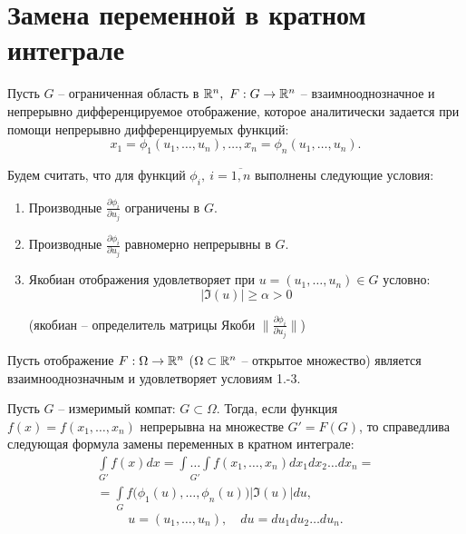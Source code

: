 

\section{Замена переменной в кратном интеграле}

\begin{note}
    Пусть $ G $ -- ограниченная область в $ \mathbb{R}^n, \ F: G \rightarrow \mathbb{R}^n $ -- взаимнооднозначное и непрерывно дифференцируемое отображение, которое аналитически задается при помощи непрерывно дифференцируемых функций:
    \[
        x_1 = \phi_1(u_1,\ldots,u_n),\ldots,x_n = \phi_n(u_1,\ldots,u_n).
    \]

    Будем считать, что для функций $ \phi_i, \ i = \overline{1,n} $ выполнены следующие условия:
    \begin{enumerate}
        \item Производные $ \frac{\partial \phi_i}{\partial u_j} $ ограничены в $ G $.
        \item Производные $ \frac{\partial \phi_i}{\partial u_j} $ равномерно непрерывны в $ G $.
        \item Якобиан отображения удовлетворяет при $ u = (u_1,\ldots,u_n) \in G $ условно:
              \[
                  \big|\mathfrak{I}(u)\big| \geqslant \alpha > 0
              \]
              \begin{center}
                  (якобиан -- определитель матрицы Якоби $ \|\frac{\partial \phi_i}{\partial u_j}\| $)
              \end{center}
    \end{enumerate}
\end{note}

\begin{theorem}
    Пусть отображение $ F: \Omega \rightarrow \mathbb{R}^n $ ($ \Omega \subset \mathbb{R}^n $ -- открытое множество) является взаимнооднозначным и удовлетворяет условиям 1.-3.

    Пусть $ G $ -- измеримый компат: $ G \subset \Omega $. Тогда, если функция $ f(x) = f(x_1,\ldots,x_n) $ непрерывна на множестве $ G'=F(G) $, то справедлива следующая формула замены переменных в кратном интеграле:
    \begin{multline*}
        \int\limits_{G'}f(x)dx = \underset{G'}{\int\ldots\int}f(x_1,\ldots,x_n)dx_1dx_2\ldots dx_n = \\
        = \int\limits_G f\big(\phi_1(u),\ldots,\phi_n(u)\big)\big|\mathfrak{I}(u)\big|du,
    \end{multline*}
    \[
        u = (u_1,\ldots,u_n), \quad du = du_1du_2\ldots du_n.
    \]
\end{theorem}

